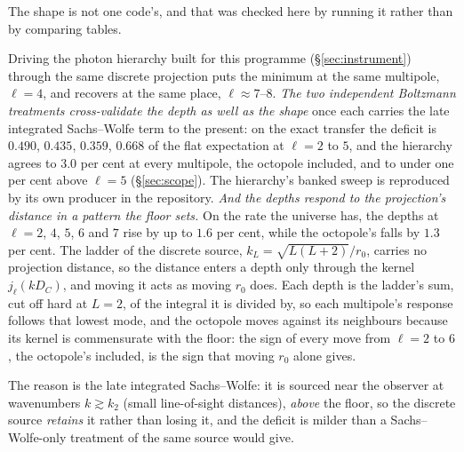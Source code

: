 \documentclass[11pt,a4paper]{article}
\theoremstyle{plain}
\theoremstyle{definition}
\theoremstyle{remark}
\begin{document}
The shape is not one code's, and that was checked here by running it rather than by comparing tables. 

Driving the photon hierarchy built for this programme (\S\ref{sec:instrument}) through the same discrete projection puts the minimum at the same multipole, $\ell=4$, and recovers at the same place, $\ell\approx7$--$8$. \emph{The two independent Boltzmann treatments cross-validate the depth as well as the shape} once each carries the late integrated Sachs--Wolfe term to the present: on the exact transfer the deficit is $0.490$, $0.435$, $0.359$, $0.668$ of the flat expectation at $\ell=2$ to $5$, and the hierarchy agrees to $3.0$ per cent at every multipole, the octopole included, and to under one per cent above $\ell=5$ (\S\ref{sec:scope}). The hierarchy's banked sweep is reproduced by its own producer in the repository. \emph{And the depths respond to the projection's distance in a pattern the floor sets.} On the rate the universe has, the depths at $\ell=2$, $4$, $5$, $6$ and $7$ rise by up to $1.6$ per cent, while the octopole's falls by $1.3$ per cent. The ladder of the discrete source, $k_L=\sqrt{L(L+2)}/r_0$, carries no projection distance, so the distance enters a depth only through the kernel $j_\ell(kD_C)$, and moving it acts as moving $r_0$ does. Each depth is the ladder's sum, cut off hard at $L=2$, of the integral it is divided by, so each multipole's response follows that lowest mode, and the octopole moves against its neighbours because its kernel is commensurate with the floor: the sign of every move from $\ell=2$ to $6$, the octopole's included, is the sign that moving $r_0$ alone gives. 

The reason is the late integrated Sachs--Wolfe: it is sourced near the observer at wavenumbers $k\gtrsim k_2$ (small line-of-sight distances), \emph{above} the floor, so the discrete source \emph{retains} it rather than losing it, and the deficit is milder than a Sachs--Wolfe-only treatment of the same source would give. 
\end{document}
